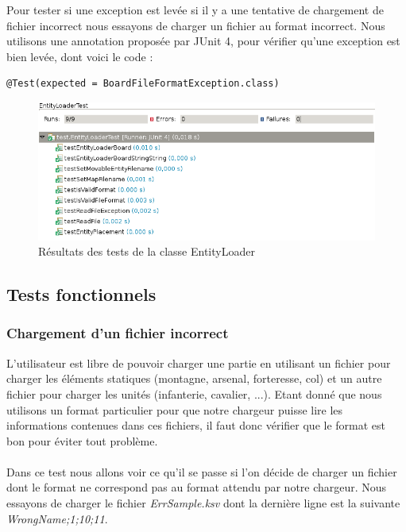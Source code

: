 				Pour tester si une exception est levée si il y a une tentative de chargement de fichier incorrect nous essayons de charger un fichier au format incorrect.
				Nous utilisons une annotation proposée par JUnit 4, pour vérifier qu'une exception est bien levée, dont voici le code : 
				
				\begin{lstlisting}[frame=single]
@Test(expected = BoardFileFormatException.class)
				\end{lstlisting}

				\begin{figure}[!h]
				    \caption{Résultats des tests de la classe EntityLoader}
				    \centerline{\includegraphics[scale=0.7]{images/tests_unitaires/entityloader.png}}
				\end{figure}

				
		\subsection{Tests fonctionnels}
		
			\subsubsection{Chargement d'un fichier incorrect}
				L'utilisateur est libre de pouvoir charger une partie en utilisant un fichier pour charger les éléments statiques (montagne, arsenal, forteresse, col) et un autre fichier pour charger les unités (infanterie, cavalier, ...). Etant donné que nous utilisons un format particulier pour que notre chargeur puisse lire les informations contenues dans ces fichiers, il faut donc vérifier que le format est bon pour éviter tout problème.
				\\ \\
				Dans ce test nous allons voir ce qu'il se passe si l'on décide de charger un fichier dont le format ne correspond pas au format attendu par notre chargeur.
				Nous essayons de charger le fichier {\itshape ErrSample.ksv} dont la dernière ligne est la suivante {\itshape WrongName;1;10;11}. 

